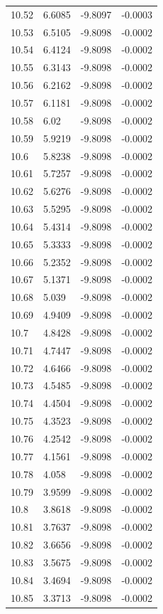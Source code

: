 \begin{tabular}{llll}
10.52 & 6.6085 & -9.8097 & -0.0003 \\
10.53 & 6.5105 & -9.8098 & -0.0002 \\
10.54 & 6.4124 & -9.8098 & -0.0002 \\
10.55 & 6.3143 & -9.8098 & -0.0002 \\
10.56 & 6.2162 & -9.8098 & -0.0002 \\
10.57 & 6.1181 & -9.8098 & -0.0002 \\
10.58 & 6.02 & -9.8098 & -0.0002 \\
10.59 & 5.9219 & -9.8098 & -0.0002 \\
10.6 & 5.8238 & -9.8098 & -0.0002 \\
10.61 & 5.7257 & -9.8098 & -0.0002 \\
10.62 & 5.6276 & -9.8098 & -0.0002 \\
10.63 & 5.5295 & -9.8098 & -0.0002 \\
10.64 & 5.4314 & -9.8098 & -0.0002 \\
10.65 & 5.3333 & -9.8098 & -0.0002 \\
10.66 & 5.2352 & -9.8098 & -0.0002 \\
10.67 & 5.1371 & -9.8098 & -0.0002 \\
10.68 & 5.039 & -9.8098 & -0.0002 \\
10.69 & 4.9409 & -9.8098 & -0.0002 \\
10.7 & 4.8428 & -9.8098 & -0.0002 \\
10.71 & 4.7447 & -9.8098 & -0.0002 \\
10.72 & 4.6466 & -9.8098 & -0.0002 \\
10.73 & 4.5485 & -9.8098 & -0.0002 \\
10.74 & 4.4504 & -9.8098 & -0.0002 \\
10.75 & 4.3523 & -9.8098 & -0.0002 \\
10.76 & 4.2542 & -9.8098 & -0.0002 \\
10.77 & 4.1561 & -9.8098 & -0.0002 \\
10.78 & 4.058 & -9.8098 & -0.0002 \\
10.79 & 3.9599 & -9.8098 & -0.0002 \\
10.8 & 3.8618 & -9.8098 & -0.0002 \\
10.81 & 3.7637 & -9.8098 & -0.0002 \\
10.82 & 3.6656 & -9.8098 & -0.0002 \\
10.83 & 3.5675 & -9.8098 & -0.0002 \\
10.84 & 3.4694 & -9.8098 & -0.0002 \\
10.85 & 3.3713 & -9.8098 & -0.0002 \\

\end{tabular}
